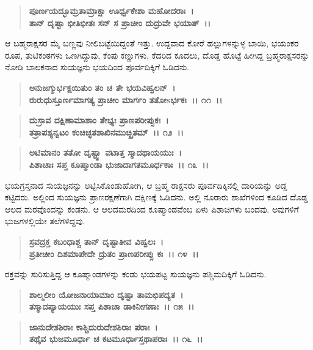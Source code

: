 \begin{verse}
\textbf{ಪೂರ್ಣಯದ್ಭೂಮ್ರತಾಮ್ರಾಕ್ಷಾ ಊರ್ಧ್ವಕೇಶಾ ಮಹೋದರಾಃ~।}\\\textbf{ತಾನ್ ದೃಷ್ಟಾ ಭೀತಿಭೀತಃ ಸನ್ ಸ ಪ್ರಾಚೀಂ ದುದ್ರುವೇ ಭಯಾತ್~।।}
\end{verse}

ಆ ಬಹ್ಮರಾಕ್ಷಸರ ಮೈ ಬಣ್ಣವು ನೀಲಿಬಟ್ಟೆಯಿದ್ದಂತೆ ಇತ್ತು. ಉದ್ದವಾದ ಕೋರೆ ಹಲ್ಲುಗಳನ್ನುಳ್ಳ ಬಾಯಿ, ಭಯಂಕರ ರೂಪ, ತುಟಿಕಂಠಗಳು ಒಣಗಿದ್ದುವು, ಕೆಂಪು ಕಣ್ಣುಗಳು, ಕೆದರಿದ ಕೂದಲು, ದೊಡ್ಡ ಹೊಟ್ಟೆ ಹೀಗಿದ್ದ ಬ್ರಹ್ಮರಾಕ್ಷಸರನ್ನು ನೋಡಿ ಬಾಲಕನಾದ ಸುಯಜ್ಞನು ಭಯದಿಂದ ಪೂರ್ವದಿಕ್ಕಿಗೆ ಓಡಿದನು.

\begin{verse}
\textbf{ಅನುಜಗ್ಮುರ್ಭಕ್ಷಯಿತುಂ ತಂ ಚ ತೇ ಭಯವಿಹ್ವಲನ್~।}\\\textbf{ರುರುಧುಸ್ತೂರ್ಣಮಾಗತ್ಯ ಪ್ರಾಚೀಂ ಮಾರ್ಗಂ ತತೋsರ್ಭಕಃ~।। ೧೧~।। }
\end{verse}

\begin{verse}
\textbf{ದುಸ್ರಾವ ದಕ್ಷಿಣಾಮಾಶಾಂ ತೇಭ್ಯಃ ಪ್ರಾಣಪರೀಪ್ಸುಕಃ~।}\\\textbf{ತತ್ರಾಪಶ್ಯನ್ವಟಂ ಕಂಚಿಚ್ಛತಶಾಖಿನಮುಚ್ಛ್ರಿತಮ್~।। ೧೨~।। }
\end{verse}

\begin{verse}
\textbf{ಅಟಿಮಾನಂ ತತೋ ದೃಷ್ಟ್ವಾ ವಟಾತ್ತ ಸ್ಮಾದಥಾಯಯುಃ~।}\\\textbf{ಪಿಶಾಚಾಃ ಸಪ್ತ ಕೂಷ್ಮಾಂಡಾ ಭುಜಾದಾಗತಮೂರ್ಧಕಾಃ~।। ೧೩~।।}
\end{verse}

ಭಯಗ್ರಸ್ತನಾದ ಸುಯಜ್ಞನನ್ನು ಅಟ್ಟಿಸಿಕೊಂಡುಹೋಗಿ, ಆ ಬ್ರಹ್ಮ ರಾಕ್ಷಸರು ಪೂರ್ವದಿಕ್ಕಿನಲ್ಲಿ ದಾರಿಯನ್ನು ಅಡ್ಡ ಕಟ್ಟಿದರು. ಅಲ್ಲಿಂದ ಸುಯಜ್ಞನು ಪ್ರಾಣರಕ್ಷಣೆಗಾಗಿ ದಕ್ಷಿಣಕ್ಕೆ ಓಡಿದನು. ಅಲ್ಲಿ ನೂರಾರು ಶಾಖೆಗಳಿಂದ ಕೂಡಿದ ದೊಡ್ಡ ಆಲದ ಮರವೊಂದನ್ನು ಕಂಡನು. ಆ ಆಲದಮರದಿಂದ ಕೂಷ್ಮಾಂಡವೆಂಬ ಏಳು ಪಿಶಾಚಿಗಳು ಬಂದವು. ಅವುಗಳಿಗೆ ಭುಜಗಳಲ್ಲಿಯೇ ತಲೆಗಳಿದ್ದವು.

\begin{verse}
\textbf{ಸ್ರವದ್ರಕ್ತ ಕಬಂಧಾಶ್ಚ ತಾನ್ ದೃಷ್ಟಾತೀವ ವಿಹ್ವಲಃ~।}\\\textbf{ಪ್ರತೀಚೀಂ ದಿಶಮಾಪೇದೇ ದ್ರುತಂ ಪ್ರಾಣಪರೀಪ್ಸು ಕಃ~।। ೧೪~।।}
\end{verse}

ರಕ್ತವನ್ನು ಸುರಿಸುತ್ತಿದ್ದ ಆ ಕೂಷ್ಮಾಂಡಗಳನ್ನು ಕಂಡು ಭಯಪಟ್ಟ ಸುಯಜ್ಞನು ಪಶ್ಚಿಮದಿಕ್ಕಿಗೆ ಓಡಿದನು.

\begin{verse}
\textbf{ಶಾಲ್ಮಲೀಂ ಯೋಜನಾಯಾಮಾಂ ದೃಷ್ಟಾ ತಾಮಭಿಪದ್ಯತ~।}\\\textbf{ತಸ್ಮಾದಪ್ಯಾಯಯುಃ ಸಪ್ತ ಪಿಶಾಚಾ ಡಾಕಿನೀಗಣಾಃ~।। ೧೫~।। }
\end{verse}

\begin{verse}
\textbf{ಜಾನುದೇಶಶಿರಾಃ ಕಾಶ್ಚಿದುರುದೇಶಶಿರಾಃ ಪರಾಃ~।}\\\textbf{ತಥೈವ ಭುಜಮೂರ್ಧಾ ಚ ಕಟಮೂರ್ಧಾಸ್ತಥಾಪರಾಃ~।। ೧೬~।।} 
\end{verse}

